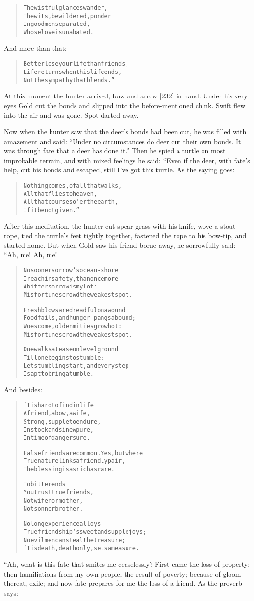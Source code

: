 \documentclass[article, twoside, 14pt]{memoir}
\renewenvironment{verbatim}{%
\begin{quote}%
\vskip -10pt%
\begin{alltt}\normalfont\large}{\end{alltt}%
\end{quote}%
\vskip -10pt
} %
\begin{document}
\begin{verbatim}
The wistful glances wander,
The wits, bewildered, ponder
In good men separated,
Whose love is unabated.
\end{verbatim}
And more than that:

\begin{verbatim}
Better lose your life than friends;
Life returns when this life ends,
Not the sympathy that blends.”
\end{verbatim}
At this moment the hunter arrived, bow and arrow [232] in hand.
Under his very eyes Gold cut the bonds and slipped into the
before-mentioned chink. Swift flew into the air and was gone. Spot
darted away.

Now when the hunter saw that the deer's bonds had been cut, he was
filled with amazement and said:
``Under no circumstances do deer cut their own bonds. It was through fate that a deer has done it.''
Then he spied a turtle on most improbable terrain, and with mixed
feelings he said: “Even if the deer, with fate's help, cut his
bonds and escaped, still I've got this turtle. As the saying goes:

\begin{verbatim}
Nothing comes, of all that walks,
    All that flies to heaven,
All that courses o'er the earth,
    If it be not given.”
\end{verbatim}
After this meditation, the hunter cut spear-grass with his knife,
wove a stout rope, tied the turtle's feet tightly together,
fastened the rope to his bow-tip, and started home. But when Gold
saw his friend borne away, he sorrowfully said: “Ah, me! Ah, me!

\begin{verbatim}
No sooner sorrow's ocean-shore
I reach in safety, than once more
A bitter sorrow is my lot:
Misfortunes crowd the weakest spot.

Fresh blows are dreadful on a wound;
Food fails, and hunger-pangs abound;
Woes come, old enmities grow hot:
Misfortunes crowd the weakest spot.

One walks at ease on level ground
    Till one begins to stumble;
Let stumbling start, and every step
    Is apt to bring a tumble.
\end{verbatim}
And besides:

\begin{verbatim}
'Tis hard to find in life
A friend, a bow, a wife,
Strong, supple to endure,
In stock and sinew pure,
In time of danger sure.

False friends are common. Yes, but where
True nature links a friendly pair,
The blessing is as rich as rare.

To bitter ends
You trust true friends,
Not wife nor mother,
Not son nor brother.

No long experience alloys
True friendship's sweet and supple joys;
No evil men can steal the treasure;
'Tis death, death only, sets a measure.
\end{verbatim}
“Ah, what is this fate that smites me ceaselessly? First came the
loss of property; then humiliations from my own people, the result
of poverty; because of gloom thereat, exile; and now fate prepares
for me the loss of a friend. As the proverb says:
\end{document}
